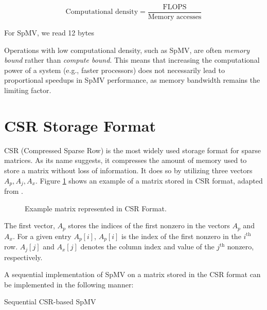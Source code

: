 \begin{equation}
    \text{Computational density} = \frac{\text{FLOPS}}{\text{Memory accesses}}
    \label{eq:computationaldensity}
\end{equation}

For SpMV, we read 12 bytes  

Operations with low computational density, such as SpMV, are often \textit{memory bound} rather than \textit{compute bound}. This means that increasing the computational power of a system (e.g., faster processors) does not necessarily lead to proportional speedups in SpMV performance, as memory bandwidth remains the limiting factor.




\section{CSR Storage Format}
CSR (Compressed Sparse Row) is the most widely used storage format for sparse matrices. As its name suggests, it compresses the amount of memory used to store a matrix without loss of information. It does so by utilizing three vectors \(A_{p}, A_{j}, A_{x}\). Figure \ref{fig:csrformat} shows an example of a matrix stored in CSR format, adapted from \cite{gupta2024gamgi}.



\begin{figure}[ht]
    \centering
    \caption{Example matrix represented in CSR Format.}
    \label{fig:csrformat}
\end{figure}


The first vector, \(A_{p}\) stores the indices of the first nonzero in the vectors \(A_{p}\) and \(A_{x}\). For a given entry \(A_{p}[i]\), \(A_{p}[i]\) is the index of the first nonzero in the \(i^{\text{th}}\) row. \(A_{j}[j]\) and \(A_{x}[j]\) denotes the column index and value of the \(j^{\text{th}}\) nonzero, respectively.
\medskip

A sequential implementation of SpMV on a matrix stored in the CSR format can be implemented in the following manner:
\medskip

\begin{algorithm}[H]
    \caption{Sequential CSR-based SpMV}
    \SetAlgoVlined

\end{algorithm}
\medskip



